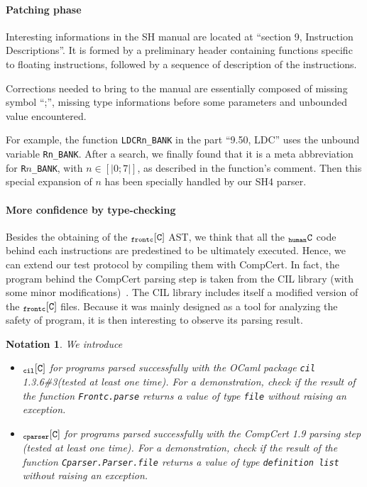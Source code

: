 \documentclass[a4paper, 11pt]{article}
\newcommand{\compcert}{CompCert 1.9\xspace}
\newcommand{\ccert}{CompCert\xspace}
\newcommand{\cilv}{1.3.6\#3\xspace}
\newcommand{\hC}{$_{\tt human}{\tt C}$\xspace}
\newcommand{\frontC}{$_{\tt frontc}{\tt [C]}$\xspace}
\newcommand{\cilC}{$_{\tt cil}{\tt [C]}$\xspace}
\newcommand{\cparserC}{$_{\tt cparser}{\tt [C]}$\xspace}
\newtheorem*{note}{Notation}
\begin{document}
\paragraph{Patching phase}

Interesting informations in the SH manual are located at ``section 9, Instruction Descriptions''. It is formed by a preliminary header containing functions specific to floating instructions, followed by a sequence of description of the instructions. 

Corrections needed to bring to the manual are essentially composed of missing symbol ``;'', missing type informations before some parameters and unbounded value encountered. 

For example, the function \verb|LDCRn_BANK| in the part ``9.50, LDC'' uses the unbound variable \verb|Rn_BANK|.  After a search, we finally found that it is a meta abbreviation for \verb|R|$n$\verb|_BANK|, with $n \in [|0;7|]$, as described in the function's comment. Then this special expansion of $n$ has been specially handled by our SH4 parser.

    \paragraph{More confidence by type-checking}
Besides the obtaining of the \frontC AST, we think that all the \hC code behind each instructions are predestined to be ultimately executed. Hence, we can extend our test protocol by compiling them with \ccert.
In fact, the program behind the \ccert parsing step is taken from the CIL library (with some minor modifications)~\cite{necula}. The CIL library includes itself a modified version of the \frontC files. Because it was mainly designed as a tool for analyzing the safety of program, it is then interesting to observe its parsing result.
\begin{note}
We introduce
\begin{itemize}
\item \cilC for programs parsed successfully with the OCaml package {\tt cil} \cilv (tested at least one time). For a demonstration, check if the result of the function \verb|Frontc.parse| returns a value of type \verb|file| without raising an exception. 
\item \cparserC for programs parsed successfully with the \compcert parsing step (tested at least one time). For a demonstration, check if the result of the function \verb|Cparser.Parser.file| returns a value of type \verb|definition list| without raising an exception. 
\end{itemize}
\end{note}
\end{document}
